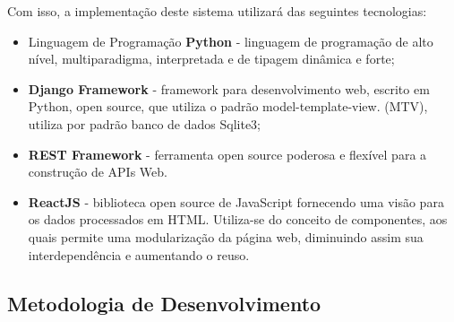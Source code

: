 Com isso, a implementação deste sistema utilizará das seguintes tecnologias:
\begin{itemize}
	\item Linguagem de Programação \textbf{Python} - linguagem de programação de alto nível, multiparadigma, interpretada e de tipagem dinâmica e forte;
	\item \textbf{Django Framework} - framework para desenvolvimento web, escrito em Python, open source, que utiliza o padrão model-template-view. (MTV), utiliza por padrão banco de dados Sqlite3;
	\item \textbf{REST Framework} -  ferramenta open source poderosa e flexível para a construção de APIs Web.
	\item \textbf{ReactJS} - biblioteca open source de JavaScript fornecendo uma visão para os dados processados em HTML. Utiliza-se do conceito de componentes, aos quais permite uma modularização da página web, diminuindo assim sua interdependência e aumentando o reuso.
	
\end{itemize}

\subsection{Metodologia de Desenvolvimento}

